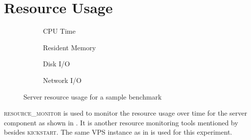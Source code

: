 \section{Resource Usage}
\label{sec:eval.resource}

\begin{figure}
	\centering

	\begin{subfigure}{.45\textwidth}
		\centering
		\caption{CPU Time}
		\label{fig:eval.perf.cpu}
	\end{subfigure}%
	\hfill%
	\begin{subfigure}{.45\textwidth}
		\centering
		\caption{Resident Memory}
		\label{fig:eval.perf.rss}
	\end{subfigure}

	\vspace{1cm}

	\begin{subfigure}{.45\textwidth}
		\centering
		\caption{Disk I/O}
		\label{fig:eval.perf.disk}
	\end{subfigure}%
	\hfill%
	\begin{subfigure}{.45\textwidth}
		\centering
		\caption{Network I/O}
		\label{fig:eval.perf.network}
	\end{subfigure}

	\caption{Server resource usage for a sample benchmark}
	\label{fig:eval.perf}
\end{figure}

\textsc{resource\_monitor} \citep{ResourceMonitorCooperative} is used to monitor the resource usage over time for the server component as shown in .
It is another resource monitoring tools mentioned by \citet{juvePracticalResourceMonitoring2015} besides \textsc{kickstart}.
The same VPS instance as in  is used for this experiment.

